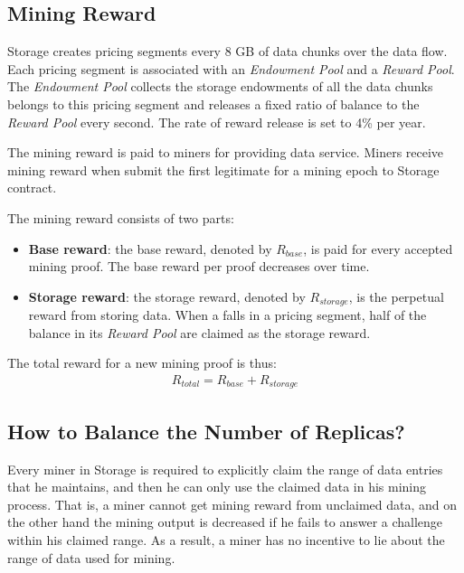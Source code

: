 

\subsection{Mining Reward}
\label{subsec:mining reward}

\projabbrev Storage creates pricing segments every 8 GB of data chunks over the data flow. 
%
Each pricing segment is associated with an \emph{Endowment Pool} and a \emph{Reward Pool}. 
%
The \emph{Endowment Pool} collects the storage endowments of all the data chunks belongs to this pricing segment and releases a fixed ratio of balance to the \emph{Reward Pool} every second. 
%
The rate of reward release is set to 4\% per year. 


The mining reward is paid to miners for providing data service.
Miners receive mining reward when submit the first legitimate {\sproof} for a mining epoch to \projabbrev Storage contract.

The mining reward consists of two parts:
\begin{itemize}
	\item {\bf Base reward}: the base reward, denoted by $R_{base}$, is paid for every accepted mining proof. The base reward per proof decreases over time.

	\item {\bf Storage reward}:  the storage reward, denoted by $R_{storage}$, is the perpetual reward from storing data. 
	When a {\sproof} falls in a pricing segment, half of the balance in its \emph{Reward Pool} are claimed as the storage reward. 

\end{itemize}

The total reward for a new mining proof is thus:
\begin{align}
	R_{total} = R_{base} + R_{storage}
\end{align}


\subsection{How to Balance the Number of Replicas?}

Every miner in \projabbrev Storage is required to explicitly claim the range of data entries that he maintains, 
and then he can only use the claimed data in his mining process.
That is, a miner cannot get mining reward from unclaimed data, and on the other hand the mining output is decreased if he fails to answer a challenge within his claimed range.
As a result, a miner has no incentive to lie about the range of data used for mining.

